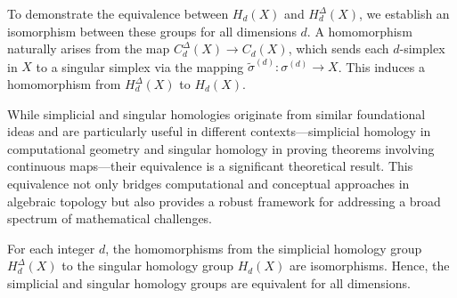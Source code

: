 To demonstrate the equivalence between $H_{d}(X)$ and $H^{\Delta}_{d}(X)$, we
establish an isomorphism between these groups for all dimensions $d$. A homomorphism
naturally arises from the map $C^{\Delta}_{d}(X) \rightarrow C_{d}(X)$, which
sends each $d$-simplex in $X$ to a singular simplex via the mapping
$\tilde{\sigma}^{(d)}: \sigma^{(d)}\rightarrow X$. This induces a homomorphism from
$H^{\Delta}_{d}(X)$ to $H_{d}(X)$.

While simplicial and singular homologies originate from similar foundational ideas
and are particularly useful in different contexts—simplicial homology in computational
geometry and singular homology in proving theorems involving continuous maps—their
equivalence is a significant theoretical result. This equivalence not only
bridges computational and conceptual approaches in algebraic topology but also
provides a robust framework for addressing a broad spectrum of mathematical
challenges.

\begin{theorem}
	For each integer $d$, the homomorphisms from the simplicial homology group
	$H^{\Delta}_{d}(X)$ to the singular homology group $H_{d}(X)$ are isomorphisms.
	Hence, the simplicial and singular homology groups are equivalent for all
	dimensions.
\end{theorem}

